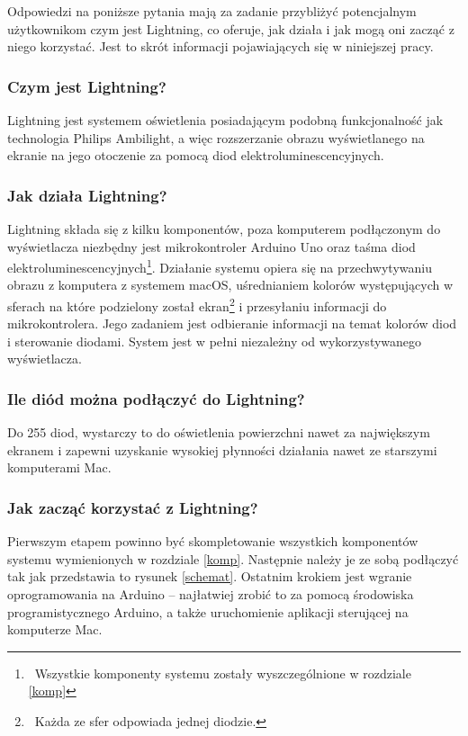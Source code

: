 \documentclass[12pt]{report}
\begin{document}
Odpowiedzi na poniższe pytania mają za zadanie przybliżyć potencjalnym użytkownikom czym jest Lightning, co oferuje, jak działa i jak mogą oni zacząć z niego korzystać. Jest to skrót informacji pojawiających się w niniejszej pracy.

\subsubsection{Czym jest Lightning?}

Lightning jest systemem oświetlenia posiadającym podobną funkcjonalność jak technologia Philips Ambilight, a więc rozszerzanie obrazu wyświetlanego na ekranie na jego otoczenie za pomocą diod elektroluminescencyjnych.

\subsubsection{Jak działa Lightning?}

Lightning składa się z kilku komponentów, poza komputerem podłączonym do wyświetlacza niezbędny jest mikrokontroler Arduino Uno oraz taśma diod elektroluminescencyjnych\footnote{~Wszystkie komponenty systemu zostały wyszczególnione w rozdziale \ref{komp}}. Działanie systemu opiera się na przechwytywaniu obrazu z komputera z systemem macOS, uśrednianiem kolorów występujących w sferach na które podzielony został ekran\footnote{~Każda ze sfer odpowiada jednej diodzie.} i przesyłaniu informacji do mikrokontrolera. Jego zadaniem jest odbieranie informacji na temat kolorów diod i sterowanie diodami. System jest w pełni niezależny od wykorzystywanego wyświetlacza.

\subsubsection{Ile diód można podłączyć do Lightning?}

Do 255 diod, wystarczy to do oświetlenia powierzchni nawet za największym ekranem i zapewni uzyskanie wysokiej płynności działania nawet ze starszymi komputerami Mac.

\subsubsection{Jak zacząć korzystać z Lightning?}

Pierwszym etapem powinno być skompletowanie wszystkich komponentów systemu wymienionych w rozdziale \ref{komp}. Następnie należy je ze sobą podłączyć tak jak przedstawia to rysunek \ref{schemat}. Ostatnim krokiem jest wgranie oprogramowania na Arduino -- najłatwiej zrobić to za pomocą środowiska programistycznego Arduino, a także uruchomienie aplikacji sterującej na komputerze Mac. 
\end{document}
